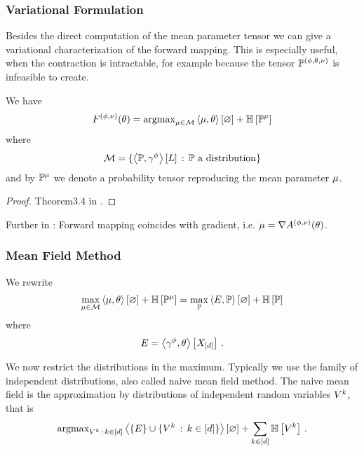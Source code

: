 \subsubsection{Variational Formulation}

Besides the direct computation of the mean parameter tensor we can give a variational characterization of the forward mapping.
This is especially useful, when the contraction is intractable, for example because the tensor $\mathbb{P}^{(\phi,\theta,\nu)}$ is infeasible to create.

\begin{theorem}
	We have
	\begin{align*}
		F^{(\phi,\nu)}(\theta)
		  = \mathrm{argmax}_{\mu\in\mathcal{M}}  \left\langle \mu,\theta\right\rangle \left[ \varnothing \right] + \mathbb{H}\left[\mathbb{P}^{\mu}\right] 
	\end{align*}
	where 
	\begin{align*}
		 \mathcal{M} = \{  \left\langle \mathbb{P},\gamma^{\phi}\right\rangle \left[ L \right] \, :  \,  \mathbb{P} \,\, \text{a distribution} \}
	\end{align*}
	and by $\mathbb{P}^{\mu}$ we denote a probability tensor reproducing the mean parameter $\mu$.
\end{theorem}
\begin{proof}
	Theorem3.4 in \cite{wainwright_graphical_2008}.
\end{proof}


Further in \cite{wainwright_graphical_2008}: 
Forward mapping coincides with gradient, i.e. $\mu = \nabla A^{(\phi,\nu)}(\theta)$.


\subsubsection{Mean Field Method}



We rewrite 
\begin{align*}
	\max_{\mu\in\mathcal{M}}  \left\langle \mu,\theta\right\rangle \left[ \varnothing \right] + \mathbb{H}\left[\mathbb{P}^{\mu}\right] 
	=
	\max_{\mathbb{P}} \left\langle E,\mathbb{P}\right\rangle \left[ \varnothing \right] + \mathbb{H}\left[\mathbb{P}\right]
\end{align*}
where
	\[ E = \left\langle \gamma^{\phi},\theta\right\rangle \left[ X_{[d]} \right] \, . \]

We now restrict the distributions in the maximum.
Typically we use the family of independent distributions, also called naive mean field method.
The naive mean field is the approximation by distributions of independent random variables $V^{k}$, that is
\begin{align*}
	\mathrm{argmax}_{V^{k} \, : \, k\in[d]} \left\langle \{E\} \cup \{V^{k} \, : \, k\in[d]\}\right\rangle \left[ \varnothing \right]
	+ \sum_{k\in[d]} \mathbb{H}\left[V^{k}\right] \, . 
\end{align*}


